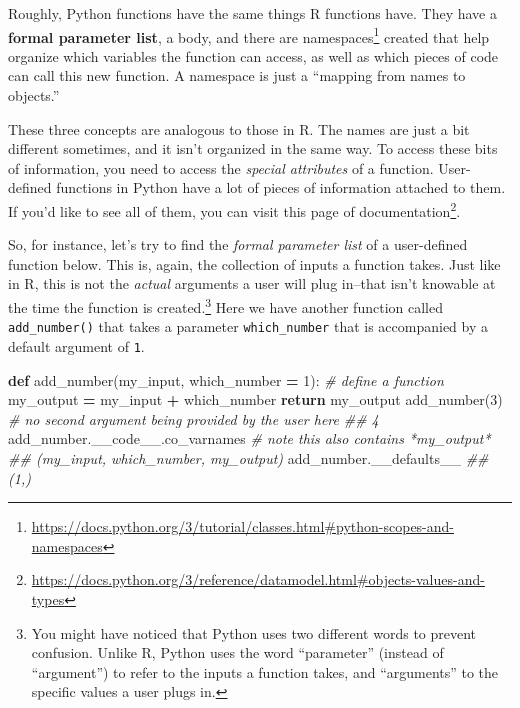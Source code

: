 \documentclass[
  12pt,
]{krantz}
\makeatletter
\newenvironment{Shaded}{\begin{snugshade}}{\end{snugshade}}
\newcommand{\CommentTok}[1]{\textcolor[rgb]{0.37,0.37,0.37}{\textit{#1}}}
\newcommand{\ControlFlowTok}[1]{\textcolor[rgb]{0.27,0.27,0.27}{\textbf{#1}}}
\newcommand{\DecValTok}[1]{\textcolor[rgb]{0.06,0.06,0.06}{#1}}
\newcommand{\KeywordTok}[1]{\textcolor[rgb]{0.27,0.27,0.27}{\textbf{#1}}}
\newcommand{\NormalTok}[1]{#1}
\newcommand{\OperatorTok}[1]{\textcolor[rgb]{0.43,0.43,0.43}{\textbf{#1}}}
\renewcommand{\href}[2]{#2\footnote{\url{#1}}}
\newenvironment{kframe}{%
\medskip{}
\setlength{\fboxsep}{.8em}
 \def\at@end@of@kframe{}%
 \ifinner\ifhmode%
  \def\at@end@of@kframe{\end{minipage}}%
  \begin{minipage}{\columnwidth}%
 \fi\fi%
 \def\FrameCommand##1{\hskip\@totalleftmargin \hskip-\fboxsep
 \colorbox{shadecolor}{##1}\hskip-\fboxsep
     \hskip-\linewidth \hskip-\@totalleftmargin \hskip\columnwidth}%
 \MakeFramed {\advance\hsize-\width
   \@totalleftmargin\z@ \linewidth\hsize
   \@setminipage}}%
 {\par\unskip\endMakeFramed%
 \at@end@of@kframe}
\renewenvironment{Shaded}{\begin{kframe}}{\end{kframe}}
\makeatother
\begin{document}
Roughly, Python functions have the same things R functions have. They have a \textbf{formal parameter list}, a body, and there are \href{https://docs.python.org/3/tutorial/classes.html\#python-scopes-and-namespaces}{namespaces} created that help organize which variables the function can access, as well as which pieces of code can call this new function. A namespace is just a ``mapping from names to objects.''

These three concepts are analogous to those in R. The names are just a bit different sometimes, and it isn't organized in the same way. To access these bits of information, you need to access the \emph{special attributes} of a function. User-defined functions in Python have a lot of pieces of information attached to them. If you'd like to see all of them, you can visit \href{https://docs.python.org/3/reference/datamodel.html\#objects-values-and-types}{this page of documentation}.

So, for instance, let's try to find the \emph{formal parameter list} of a user-defined function below. This is, again, the collection of inputs a function takes. Just like in R, this is not the \emph{actual} arguments a user will plug in--that isn't knowable at the time the function is created.\footnote{You might have noticed that Python uses two different words to prevent confusion. Unlike R, Python uses the word ``parameter'' (instead of ``argument'') to refer to the inputs a function takes, and ``arguments'' to the specific values a user plugs in.} Here we have another function called \texttt{add\_number()} that takes a parameter \texttt{which\_number} that is accompanied by a default argument of \texttt{1}.

\begin{Shaded}
\begin{Highlighting}[]
\KeywordTok{def}\NormalTok{ add\_number(my\_input, which\_number }\OperatorTok{=} \DecValTok{1}\NormalTok{): }\CommentTok{\# define a function}
\NormalTok{  my\_output }\OperatorTok{=}\NormalTok{ my\_input }\OperatorTok{+}\NormalTok{ which\_number}
  \ControlFlowTok{return}\NormalTok{ my\_output}
\NormalTok{add\_number(}\DecValTok{3}\NormalTok{) }\CommentTok{\# no second argument being provided by the user here}
\CommentTok{\#\# 4}
\NormalTok{add\_number.\_\_code\_\_.co\_varnames }\CommentTok{\# note this also contains *my\_output*}
\CommentTok{\#\# (\textquotesingle{}my\_input\textquotesingle{}, \textquotesingle{}which\_number\textquotesingle{}, \textquotesingle{}my\_output\textquotesingle{})}
\NormalTok{add\_number.\_\_defaults\_\_}
\CommentTok{\#\# (1,)}
\end{Highlighting}
\end{Shaded}
\end{document}
